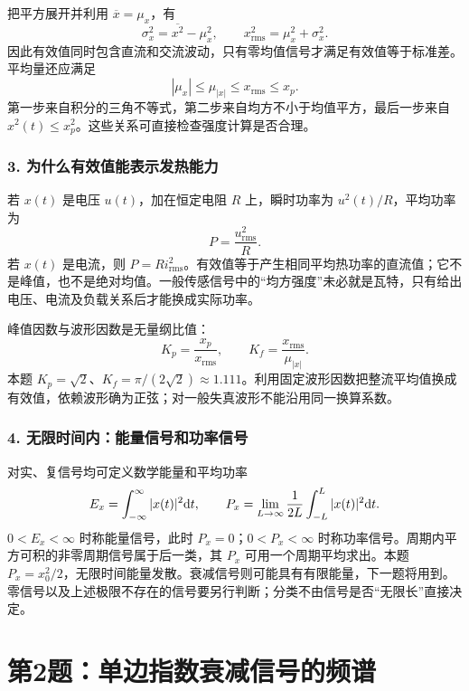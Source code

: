 把平方展开并利用 $\overline{x}=\mu_x$，有
\[
\sigma_x^2=\overline{x^2}-\mu_x^2,\qquad
x_{\mathrm{rms}}^2=\mu_x^2+\sigma_x^2.
\]
因此有效值同时包含直流和交流波动，只有零均值信号才满足有效值等于标准差。平均量还应满足
\[
|\mu_x|\leq\mu_{|x|}\leq x_{\mathrm{rms}}\leq x_p.
\]
第一步来自积分的三角不等式，第二步来自均方不小于均值平方，最后一步来自 $x^2(t)\leq x_p^2$。这些关系可直接检查强度计算是否合理。

\subsubsection*{3. 为什么有效值能表示发热能力}
若 $x(t)$ 是电压 $u(t)$，加在恒定电阻 $R$ 上，瞬时功率为 $u^2(t)/R$，平均功率为
\[
P=\frac{u_{\mathrm{rms}}^2}{R}.
\]
若 $x(t)$ 是电流，则 $P=Ri_{\mathrm{rms}}^2$。有效值等于产生相同平均热功率的直流值；它不是峰值，也不是绝对均值。一般传感信号中的“均方强度”未必就是瓦特，只有给出电压、电流及负载关系后才能换成实际功率。

峰值因数与波形因数是无量纲比值：
\[
K_p=\frac{x_p}{x_{\mathrm{rms}}},\qquad
K_f=\frac{x_{\mathrm{rms}}}{\mu_{|x|}}.
\]
本题 $K_p=\sqrt2$、$K_f=\pi/(2\sqrt2)\approx1.111$。利用固定波形因数把整流平均值换成有效值，依赖波形确为正弦；对一般失真波形不能沿用同一换算系数。

\subsubsection*{4. 无限时间内：能量信号和功率信号}
对实、复信号均可定义数学能量和平均功率
\[
E_x=\int_{-\infty}^{\infty}|x(t)|^2\mathrm{d} t,\qquad
P_x=\lim_{L\to\infty}\frac1{2L}\int_{-L}^{L}|x(t)|^2\mathrm{d} t.
\]
$0<E_x<\infty$ 时称能量信号，此时 $P_x=0$；$0<P_x<\infty$ 时称功率信号。周期内平方可积的非零周期信号属于后一类，其 $P_x$ 可用一个周期平均求出。本题 $P_x=x_0^2/2$，无限时间能量发散。衰减信号则可能具有有限能量，下一题将用到。零信号以及上述极限不存在的信号要另行判断；分类不由信号是否“无限长”直接决定。


\section{第2题：单边指数衰减信号的频谱}
\label{hw:2-2}


